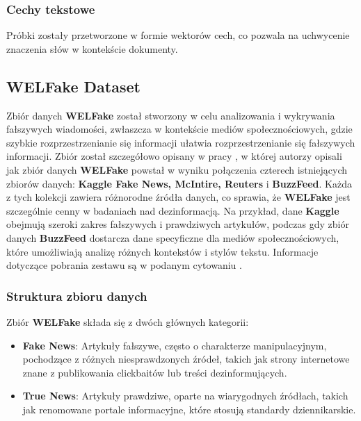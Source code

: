 \subsubsection{Cechy tekstowe}
Próbki zostały przetworzone w formie wektorów cech, co pozwala na uchwycenie znaczenia słów w kontekście dokumenty.

\subsection{WELFake Dataset}
Zbiór danych \textbf{WELFake} został stworzony w celu analizowania i wykrywania fałszywych wiadomości, zwłaszcza w kontekście mediów społecznościowych, gdzie szybkie rozprzestrzenianie się informacji ułatwia rozprzestrzenianie się fałszywych informacji. Zbiór został szczegółowo opisany w pracy \cite{WELFake}, w której autorzy opisali jak zbiór danych \textbf{WELFake} powstał w wyniku połączenia czterech istniejących zbiorów danych: \textbf{Kaggle Fake News, McIntire, Reuters} i \textbf{BuzzFeed}. Każda z tych kolekcji zawiera różnorodne źródła danych, co sprawia, że \textbf{WELFake} jest szczególnie cenny w badaniach nad dezinformacją. Na przykład, dane \textbf{Kaggle} obejmują szeroki zakres fałszywych i prawdziwych artykułów, podczas gdy zbiór danych \textbf{BuzzFeed} dostarcza dane specyficzne dla mediów społecznościowych, które umożliwiają analizę różnych kontekstów i stylów tekstu. Informacje dotyczące pobrania zestawu są w podanym cytowaniu \cite{welfake_fake_news_classification}.

\subsubsection{Struktura zbioru danych}
Zbiór \textbf{WELFake} składa się z dwóch głównych kategorii:
\begin{itemize}
	\item \textbf{Fake News}: Artykuły fałszywe, często o charakterze manipulacyjnym, pochodzące z różnych niesprawdzonych źródeł, takich jak strony internetowe znane z publikowania clickbaitów lub treści dezinformujących.
	\item \textbf{True News}: Artykuły prawdziwe, oparte na wiarygodnych źródłach, takich jak renomowane portale informacyjne, które stosują standardy dziennikarskie.
\end{itemize}

